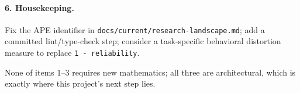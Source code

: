 \paragraph{6. Housekeeping.}
Fix the APE identifier in \texttt{docs/current/research-landscape.md}; add a
committed lint/type-check step; consider a task-specific behavioral distortion
measure to replace \texttt{1 - reliability}.

None of items 1--3 requires new mathematics; all three are architectural, which
is exactly where this project's next step lies.